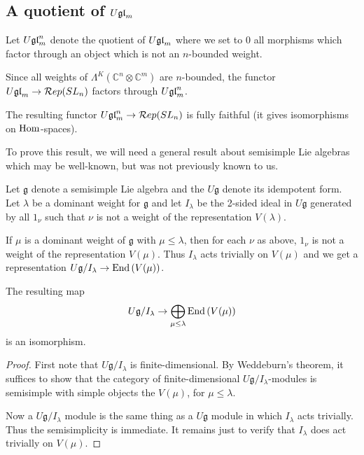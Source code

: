 \documentclass[11pt,leqno]{article}
\begin{document}
\subsection{A quotient of $U\mathfrak{gl}_{m}$}
Let $ U\mathfrak{gl}_{m}^n $ denote the quotient of $ U\mathfrak{gl}_{m} $ where we set to 0 all morphisms which factor through an object which is not an $n$-bounded weight.

Since all weights of $ \Lambda^K(\mathbb{C}^n \otimes \mathbb{C}^m) $ are $ n$-bounded, the functor $ U\mathfrak{gl}_{m} \rightarrow \mathcal{R}ep(SL_{n}) $ factors through $ U\mathfrak{gl}_{m}^n $.

\begin{thm} \label{th:functorfullyfaithful}
The resulting functor $ U\mathfrak{gl}_{m}^n \rightarrow \mathcal{R}ep(SL_{n})$ is fully faithful (it gives isomorphisms on $\operatorname{Hom}$-spaces).
\end{thm}

To prove this result, we will need a general result about semisimple Lie algebras which may be well-known, but was not previously known to us.

Let $ \mathfrak g $ denote a semisimple Lie algebra and the $ U \mathfrak g $ denote its idempotent form.  Let $ \lambda $ be a dominant weight for $ \mathfrak g $ and let $ I_\lambda $ be the 2-sided ideal in $ U\mathfrak g $ generated by all $ 1_\nu $ such that $ \nu $ is not a weight of the representation $ V(\lambda) $.

If $ \mu $ is a dominant weight of $ \mathfrak g $ with $ \mu \le \lambda $, then for each $ \nu $ as above, $ 1_\nu $ is not a weight of the representation $ V(\mu)$.  Thus $ I_\lambda $ acts trivially on $ V(\mu) $ and we get a representation $ U \mathfrak g / I_\lambda \rightarrow \operatorname{End}\left(V(\mu)\right) $.

\begin{lem}
The resulting map
$$
U \mathfrak g / I_\lambda \rightarrow \bigoplus_{\mu \le \lambda} \operatorname{End}\left( V(\mu)\right)
$$
is an isomorphism.
\end{lem}

\begin{proof}
First note that $U \mathfrak g/ I_\lambda $ is finite-dimensional.  By Weddeburn's theorem, it suffices to show that the category of finite-dimensional $ U\mathfrak g / I_\lambda $-modules is semisimple with simple objects the $ V(\mu) $, for $ \mu \le \lambda $.

Now a $ U\mathfrak g / I_\lambda$ module is the same thing as a $ U\mathfrak g $ module in which $ I_\lambda $ acts trivially.  Thus the semisimplicity is immediate.  It remains just to verify that $ I_\lambda $ does act trivially on $ V(\mu)$.

\end{proof}
\end{document}
